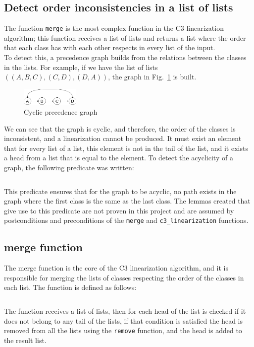 \documentclass[runningheads]{llncs}
\begin{document}
\subsection{Detect order inconsistencies in a list of lists}
\label{sec:detectOrderInconsistencies}
The function \texttt{merge} is the most complex function in the C3 linearization algorithm; this function receives a list of lists and returns a list where the order that each class has with each other respects in every list of the input.\\
To detect this, a precedence graph builds from the relations between the classes in the lists. For example, if we have the list of lists $((A, B, C),(C, D),(D, A))$, the graph in Fig.~\ref{fig:cyclicGraph} is built.
\begin{figure}[htbp]
  \centering
  \includegraphics[width=0.25\textwidth]{images/cyclicGraph.png}
  \caption{Cyclic precedence graph}
  \label{fig:cyclicGraph}
\end{figure}
We can see that the graph is cyclic, and therefore, the order of the classes is inconsistent, and a linearization cannot be produced.
It must exist an element that for every list of a list, this element is not in the tail of the list, and it exists a head from a list that is equal to the element. %
To detect the acyclicity of a graph, the following predicate was written:
\inputminted[firstline=64,lastline=80,fontsize=\small,linenos,xleftmargin=20pt]{ocaml}{../c3/cameleer/c3.ml}
This predicate ensures that for the graph to be acyclic, no path exists in the graph where the first class is the same as the last class.
The lemmas created that give use to this predicate are not proven in this project and are assumed by postconditions and preconditions of the \texttt{merge} and \texttt{c3\_linearization} functions.

\subsection{merge function}
The merge function is the core of the C3 linearization algorithm, and it is responsible for merging the lists of classes respecting the order of the classes in each list.
The function is defined as follows:
\inputminted[firstline=363,lastline=386,fontsize=\small,linenos,xleftmargin=20pt]{ocaml}{../c3/cameleer/c3.ml}
The function receives a list of lists, then for each head of the list is checked if it does not belong to any tail of the lists, 
if that condition is satisfied the head is removed from all the lists using the \texttt{remove} function, and the head is added to the result list.
\end{document}
